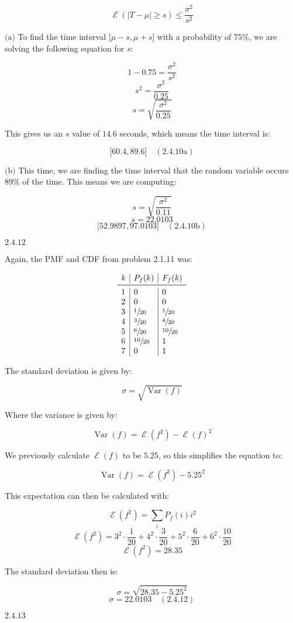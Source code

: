 \documentclass{article}
\newcommand{\problem}[2]{$\boxed{\text{#1.#2}}$}
\newcommand{\subproblem}[3]{$\boxed{\text{(#3)}}$}
\newcommand{\solution}[3]{\boxed{#3\quad(\text{#1.#2})}}
\newcommand{\subsolution}[4]{\boxed{#4\quad(\text{#1.#2#3})}}
\DeclareMathOperator{\var}{Var}
\DeclareMathOperator{\E}{\mathcal{E}}
\begin{document}
\[
\E(|T-\mu|\ge s)\le \frac{\sigma^2}{s^2}
\]

%
\subproblem{2.4}{10}{a} To find the time interval
$\lbrack\mu-s,\mu+s\rbrack$ with a probability of $75\%$, we are
solving the following equation for $s$:

\[
1-0.75=\frac{\sigma^2}{s^2}
\] \[
s^2=\frac{\sigma^2}{0.25}
\] \[
s=\sqrt{\frac{\sigma^2}{0.25}}
\]

This gives us an $s$ value of $14.6$ seconds, which means the time
interval is:

\[
\subsolution{2.4}{10}{a}{\lbrack60.4,89.6\rbrack}
\]

%
\subproblem{2.4}{10}{b} This time, we are finding the time interval
that the random variable occurs $89\%$ of the time. This means we are
computing:

\[
s=\sqrt{\frac{\sigma^2}{0.11}}
\] \[
s=22.0103
\] \[
\subsolution{2.4}{10}{b}{\lbrack52.9897,97.0103\rbrack}
\]

%
\problem{2.4}{12}

Again, the PMF and CDF from problem 2.1.11 was:

\[
\begin{array}{l|l|l}
k & P_f(k) & F_f(k) \\
\midrule
1 & 0 & 0 \\
2 & 0 & 0 \\
3 & \sfrac{1}{20} & \sfrac{1}{20} \\
4 & \sfrac{3}{20} & \sfrac{4}{20} \\
5 & \sfrac{6}{20} & \sfrac{10}{20} \\
6 & \sfrac{10}{20} & 1 \\
7 & 0 & 1 \\
\end{array}
\]

The standard deviation is given by:

\[
\sigma=\sqrt{\var(f)}
\]

Where the variance is given by:

\[
\var(f)=\E(f^2)-\E(f)^2
\]

We previously calculate $\E(f)$ to be $5.25$, so this simplifies the
equation to:

\[
\var(f)=\E(f^2)-5.25^2
\]

This expectation can then be calculated with:

\[
\E(f^2)=\sum\limits_i P_f(i) i^2
\] \[
\E(f^2)=3^2\cdot\frac{1}{20}+4^2\cdot\frac{3}{20}+5^2\cdot\frac{6}{20}+6^2\cdot\frac{10}{20}
\] \[
\E(f^2)=28.35
\]

The standard deviation then is:

\[
\sigma=\sqrt{28.35-5.25^2}
\] \[
\solution{2.4}{12}{\sigma=22.0103}
\]

%
\problem{2.4}{13}
\end{document}
